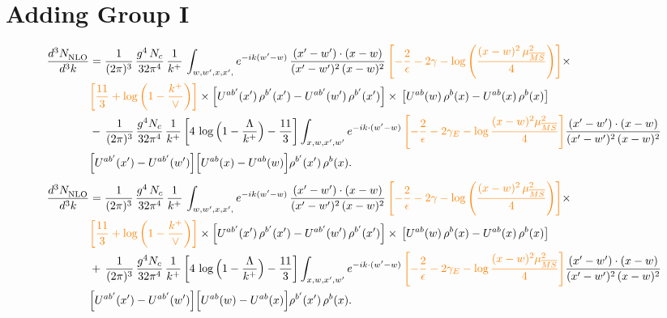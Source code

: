 \documentclass[9pt]{article}
\numberwithin{equation}{section}
\begin{document}
\section{Adding Group I}
\begin{align}
     \frac{d^{3}N_{\rm NLO}^{\rm}}{d^{3}k} &  =  \frac{1}{(2\pi)^{3}}\, \frac{g^{4}\,N_{c}}{32\pi^{4}}\,\frac{1}{k^{+}}\, \int_{w, w',x,x',} e^{-ik(w^\prime-w)}\, \frac{(x'-w')\cdot (x-w)}{(x'-w')^{2}\, (x-w)^{2}}\, {\color{orange}\left[-\frac{2}{\epsilon}-2\gamma-\log{\left(\frac{(x-w)^{2}\,\mu^{2}_{\overline{MS}}}{4}\right)}\right]}\times \notag \\ & {\color{orange}\left[\frac{11}{3}+\log{\left(1-\frac{k^{+}}{\vee}\right)}\right]}\times\left[U^{ab'}(x')\,\rho^{b'}(x') - U^{ab'}(w')\,\rho^{b'}(x')\right]\times\,\left[U^{ab}(w)\,\rho^{b}(x) - U^{ab}(x)\,\rho^{b}(x)\right]\notag \\ & -\, \frac{1}{(2\pi)^{3}}\,\frac{g^{4}N_{c}}{32\pi^{4}}\,\frac{1}{k^{+}}
\left[4\,\log\Big(1-\frac{\Lambda}{k^{+}}\Big)-\frac{11}{3}\right]\int_{x,w,x',w'}e^{-ik\cdot(w'-w)}\, {\color{orange}\left[-\frac{2}{\epsilon}-2\gamma_{E}-\log\frac{(x-w)^{2}\mu^{2}_{\overline{MS}}}{4}\right]}
\frac{(x'-w')\cdot(x-w)}{(x'-w')^{2}\,(x-w)^{2}}\notag \\ &  \Big[U^{ab'}(x')-U^{ab'}(w')\Big]\Big[U^{ab}(x)-U^{ab}(w)\Big]\rho^{b'}(x')\,\rho^{b}(x).
\end{align}
\begin{align}
     \frac{d^{3}N_{\rm NLO}^{\rm}}{d^{3}k} &  =  \frac{1}{(2\pi)^{3}}\, \frac{g^{4}\,N_{c}}{32\pi^{4}}\,\frac{1}{k^{+}}\, \int_{w, w',x,x',} e^{-ik(w^\prime-w)}\, \frac{(x'-w')\cdot (x-w)}{(x'-w')^{2}\, (x-w)^{2}}\, {\color{orange}\left[-\frac{2}{\epsilon}-2\gamma-\log{\left(\frac{(x-w)^{2}\,\mu^{2}_{\overline{MS}}}{4}\right)}\right]}\times \notag \\ & {\color{orange}\left[\frac{11}{3}+\log{\left(1-\frac{k^{+}}{\vee}\right)}\right]}\times\left[U^{ab'}(x')\,\rho^{b'}(x') - U^{ab'}(w')\,\rho^{b'}(x')\right]\times\,\left[U^{ab}(w)\,\rho^{b}(x) - U^{ab}(x)\,\rho^{b}(x)\right]\notag \\ & +\, \frac{1}{(2\pi)^{3}}\,\frac{g^{4}N_{c}}{32\pi^{4}}\,\frac{1}{k^{+}}
\left[4\,\log\Big(1-\frac{\Lambda}{k^{+}}\Big)-\frac{11}{3}\right]\int_{x,w,x',w'}e^{-ik\cdot(w'-w)}\, {\color{orange}\left[-\frac{2}{\epsilon}-2\gamma_{E}-\log\frac{(x-w)^{2}\mu^{2}_{\overline{MS}}}{4}\right]}
\frac{(x'-w')\cdot(x-w)}{(x'-w')^{2}\,(x-w)^{2}}\notag \\ &  \Big[U^{ab'}(x')-U^{ab'}(w')\Big]\Big[U^{ab}(w)-U^{ab}(x)\Big]\rho^{b'}(x')\,\rho^{b}(x).
\end{align}
\end{document}
